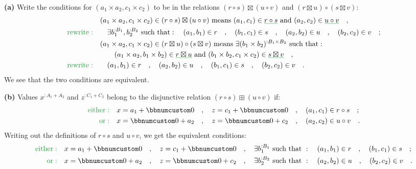 \textbf{(a)} Write the conditions for $(a_{1}\times a_{2},c_{1}\times c_{2})$
to be in the relations $(r\circ s)\boxtimes(u\circ v)$ and $(r\boxtimes u)\circ(s\boxtimes v)$:
\begin{align*}
 & (a_{1}\times a_{2},c_{1}\times c_{2})\in(r\circ s)\boxtimes(u\circ v)\text{ means }(a_{1},c_{1})\in\gunderline{r\circ s}\text{ and }(a_{2},c_{2})\in\gunderline{u\circ v}\quad,\\
{\color{greenunder}\text{rewrite}:}\quad & \quad\exists b_{1}^{:B_{1}},b_{2}^{:B_{2}}\text{ such that}:\quad(a_{1},b_{1})\in r\quad,\quad(b_{1},c_{1})\in s\quad,\quad(a_{2},b_{2})\in u\quad,\quad(b_{2},c_{2})\in v\quad;\\
 & (a_{1}\times a_{2},c_{1}\times c_{2})\in(r\boxtimes u)\circ(s\boxtimes v)\text{ means }\exists(b_{1}\times b_{2})^{:B_{1}\times B_{2}}\text{ such that}:\\
 & \quad\quad(a_{1}\times a_{2},b_{1}\times b_{2})\in\gunderline{r\boxtimes u}\text{ and }(b_{1}\times b_{2},c_{1}\times c_{2})\in\gunderline{s\boxtimes v}\quad,\\
{\color{greenunder}\text{rewrite}:}\quad & \quad(a_{1},b_{1})\in r\quad,\quad(a_{2},b_{2})\in u\quad,\quad(b_{1},c_{1})\in s\quad,\quad(b_{2},c_{2})\in v\quad.
\end{align*}
We see that the two conditions are equivalent.

\textbf{(b)} Values $x^{:A_{1}+A_{2}}$ and $z^{:C_{1}+C_{2}}$ belong
to the disjunctive relation $(r\circ s)\boxplus(u\circ v)$ if:
\begin{align*}
{\color{greenunder}\text{either}:}\quad & x=a_{1}+\bbnum 0\quad,\quad z=c_{1}+\bbnum 0\quad,\quad(a_{1},c_{1})\in r\circ s\quad;\\
{\color{greenunder}\text{or}:}\quad & x=\bbnum 0+a_{2}\quad,\quad z=\bbnum 0+c_{2}\quad,\quad(a_{2},c_{2})\in u\circ v\quad.
\end{align*}
Writing out the definitions of $r\circ s$ and $u\circ v$, we get
the equivalent conditions:
\begin{align*}
{\color{greenunder}\text{either}:}\quad & x=a_{1}+\bbnum 0\quad,\quad z=c_{1}+\bbnum 0\quad,\quad\exists b_{1}^{:B_{1}}\text{ such that }:\quad(a_{1},b_{1})\in r\quad,\quad(b_{1},c_{1})\in s\quad;\\
{\color{greenunder}\text{or}:}\quad & x=\bbnum 0+a_{2}\quad,\quad z=\bbnum 0+c_{2}\quad,\quad\exists b_{2}^{:B_{2}}\text{ such that }:\quad(a_{2},b_{2})\in u\quad,\quad(b_{2},c_{2})\in v\quad.
\end{align*}

